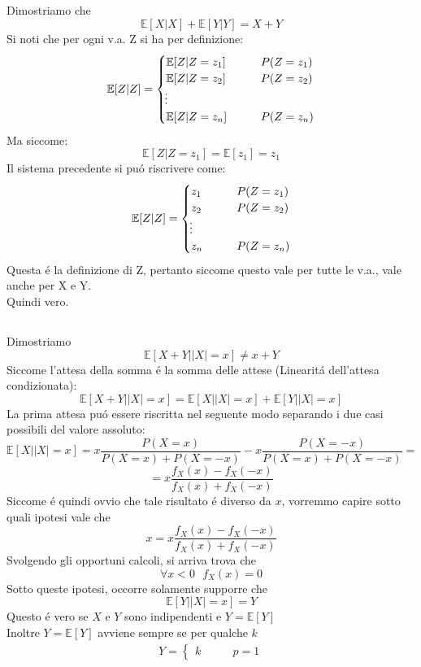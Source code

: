 \documentclass[a4paper]{article}
\newcommand{\E}[0]{\mathbb{E}}
\begin{document}
\subsection{} 
Dimostriamo che 
$$\E[X | X] + \E[Y | Y] = X + Y$$
Si noti che per ogni v.a. Z si ha per definizione:
\begin{align}
	\E[Z | Z]=
	\begin{cases}
		\E[Z | Z = z_1] \qquad & P(Z=z_1)\\
		\E[Z | Z = z_2] \qquad & P(Z=z_2)\\
        \vdotswithin{} \notag \\
		\E[Z | Z = z_n] \qquad & P(Z=z_n)\\
	\end{cases}
\end{align}
Ma siccome:
$$
\E[Z | Z = z_1] = \E[z_1] = z_1
$$
Il sistema precedente si puó riscrivere come:
\begin{align}
	\E[Z | Z]=
	\begin{cases}
		z_1 \qquad & P(Z=z_1)\\
		z_2 \qquad & P(Z=z_2)\\
        \vdotswithin{} \notag \\
		z_n \qquad & P(Z=z_n)\\
	\end{cases}
\end{align}
Questa é la definizione di Z, pertanto siccome questo vale per tutte le v.a., vale anche per X e Y. \\
Quindi vero.

\subsection{}
Dimostriamo 
$$\E[X + Y | |X| = x] \ne x + Y$$
Siccome l'attesa della somma é la somma delle attese (Linearitá dell'attesa condizionata):
$$\E[X + Y | |X| = x] = \E[X||X| = x] + \E[Y | |X| = x]$$
La prima attesa puó essere riscritta nel seguente modo separando i due casi possibili del valore assoluto:
$$
\E[X||X| = x] = x \frac{P(X= x)}{P(X= x) + P(X= -x)} - x \frac{P(X= -x)}{P(X= x) + P(X= -x)}=
$$
$$ = x\frac{f_X(x)-f_X(-x)}{f_X(x) + f_X(-x)}$$
Siccome é quindi ovvio che tale risultato é diverso da $x$, vorremmo capire sotto quali ipotesi vale che 
$$x = x\frac{f_X(x)-f_X(-x)}{f_X(x) + f_X(-x)}$$
Svolgendo gli opportuni calcoli, si arriva trova che 
$$\forall x < 0  \ \ \  f_X(x) = 0$$
Sotto queste ipotesi, occorre solamente supporre che
$$\E[Y||X| = x] = Y$$
Questo é vero se $X$ e $Y$ sono indipendenti e $Y = \E[Y]$ \\
Inoltre $Y = \E[Y]$ avviene sempre se per qualche $k$ 
\begin{align*}
	Y =
	\begin{cases}
		k \qquad & p = 1 
	\end{cases}
\end{align*}
\end{document}
